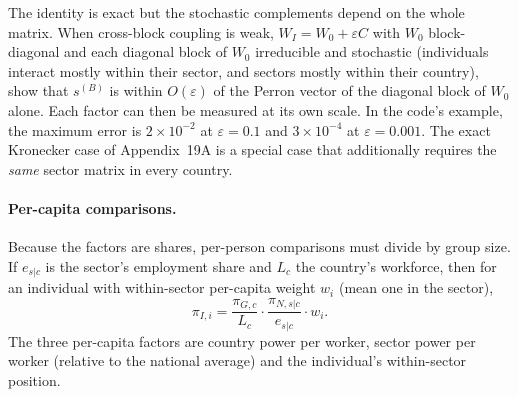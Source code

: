 \documentclass[../structural_economics_book.tex]{subfiles}
\begin{document}
\begin{remark}
The identity is exact but the stochastic complements depend on the whole matrix. When cross-block coupling is weak, $W_I = W_0 + \varepsilon C$ with $W_0$ block-diagonal and each diagonal block of $W_0$ irreducible and stochastic (individuals interact mostly within their sector, and sectors mostly within their country), \citet{simon1961aggregation} show that $s^{(B)}$ is within $O(\varepsilon)$ of the Perron vector of the diagonal block of $W_0$ alone. Each factor can then be measured at its own scale. In the code's example, the maximum error is $2\times10^{-2}$ at $\varepsilon = 0.1$ and $3\times10^{-4}$ at $\varepsilon = 0.001$. The exact Kronecker case of Appendix~19A is a special case that additionally requires the \emph{same} sector matrix in every country.
\end{remark}

\paragraph{Per-capita comparisons.} Because the factors are shares, per-person comparisons must divide by group size. If $e_{s|c}$ is the sector's employment share and $L_c$ the country's workforce, then for an individual with within-sector per-capita weight $w_i$ (mean one in the sector),
\[
\pi_{I,i} = \frac{\pi_{G,c}}{L_c}\cdot\frac{\pi_{N,s|c}}{e_{s|c}}\cdot w_i .
\]
The three per-capita factors are country power per worker, sector power per worker (relative to the national average) and the individual's within-sector position.
\end{document}
